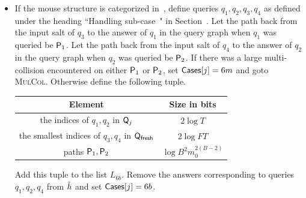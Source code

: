 \begin{enumerate}
\begin{enumerate}
\begin{itemize}
\begin{itemize}
\begin{center}
\begin{tabular}{|c|c|}
        \end{tabular}
        \end{center}
      Add the tuple to the list $L_{6a}$. Remove the answers corresponding to queries $q_1,q_2$ from $\hrest$ and set $\cs[j]=6a$.

      \item If the mouse structure is categorized in~, define queries $q_1,q_2,q_3,q_4$ as defined under the heading ``Handling sub-case~" in Section~. Let the path back from the input salt of $q_3$ to the answer of $q_1$ in the query graph when $q_1$ was queried be $\mathsf{P}_1$. Let the path back from the input salt of $q_4$ to the answer of $q_2$ in the query graph when $q_2$ was queried be $\mathsf{P}_2$.
      If there was a large multi-collision encountered on either $\mathsf{P}_1$ or $\mathsf{P}_2$, set $\mathsf{Cases}[j]=6m$ and goto \textsc{MulCol}.
      Otherwise define the following tuple.
    \begin{center}
      \begin{tabular}{|c|c|}\hline

      Element & Size in bits \\ \hline\hline

      the indices of $q_1,q_2$ in $\mathsf{Q}_j$ & $2\log T$\\ \hline
  
      the smallest indices  of $q_3,q_4$ in $\mathsf{Q}_\textsf{fresh}$ & $2\log FT$   \\\hline
              
      paths $\mathsf{P}_1,\mathsf{P}_2$ & $ \log B^2m_0^{2(B-2)}$\\\hline
      
      \end{tabular}
      \end{center}
    Add this tuple to the list $L_{6b}$. Remove the answers corresponding to queries $q_1,q_2,q_4$ from $\hrest$ and set $\mathsf{Cases}[j]=6b$.


\end{itemize}
\end{itemize}
\end{enumerate}
\end{enumerate}
